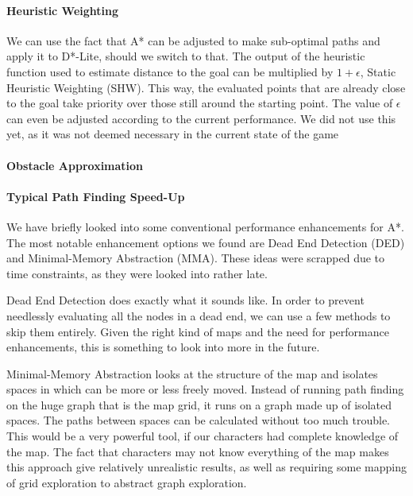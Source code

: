 \paragraph{Heuristic Weighting}
We can use the fact that A* can be adjusted to make sub-optimal paths and apply it to D*-Lite, should we switch to that. The output of the heuristic function used to estimate distance to the goal can be multiplied by $1 + \epsilon$, Static Heuristic Weighting (SHW). This way, the evaluated points that are already close to the goal take priority over those still around the starting point. The value of $\epsilon$ can even be adjusted according to the current performance. We did not use this yet, as it was not deemed necessary in the current state of the game

\paragraph{Obstacle Approximation}


\paragraph{Typical Path Finding Speed-Up}
We have briefly looked into some conventional performance enhancements for A*. The most notable enhancement options we found are Dead End Detection (DED) and Minimal-Memory Abstraction (MMA). These ideas were scrapped due to time constraints, as they were looked into rather late. 

Dead End Detection does exactly what it sounds like. In order to prevent needlessly evaluating all the nodes in a dead end, we can use a few methods to skip them entirely. Given the right kind of maps and the need for performance enhancements, this is something to look into more in the future.

Minimal-Memory Abstraction looks at the structure of the map and isolates spaces in which can be more or less freely moved. Instead of running path finding on the huge graph that is the map grid, it runs on a graph made up of isolated spaces. The paths between spaces can be calculated without too much trouble. This would be a very powerful tool, if our characters had complete knowledge of the map. The fact that characters may not know everything of the map makes this approach give relatively unrealistic results, as well as requiring some mapping of grid exploration to abstract graph exploration.

